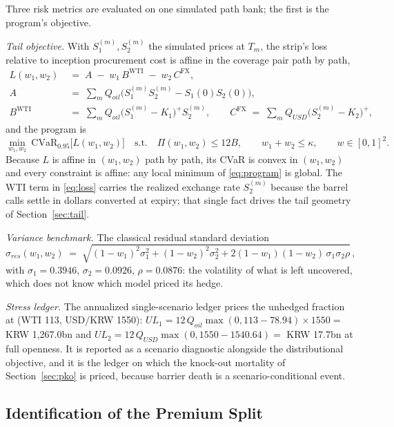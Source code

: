 \documentclass[11pt,a4paper]{article}
\begin{document}
Three risk metrics are evaluated on one simulated path bank; the first is the program's objective.

\emph{Tail objective.} With $S_1^{(m)},S_2^{(m)}$ the simulated prices at $T_m$, the strip's loss relative to inception procurement cost is affine in the coverage pair path by path,
\begin{align}
L(w_1,w_2) \;&=\; A \;-\; w_1\,B^{\mathrm{WTI}} \;-\; w_2\,C^{\mathrm{FX}},
\label{eq:loss}\\
A \;&=\; \sum_m Q_{oil}\bigl(S_1^{(m)}S_2^{(m)}-S_1(0)S_2(0)\bigr), \nonumber\\
B^{\mathrm{WTI}} \;&=\; \sum_m Q_{oil}\bigl(S_1^{(m)}-K_1\bigr)^{+}S_2^{(m)}, \qquad
C^{\mathrm{FX}} \;=\; \sum_m Q_{USD}\bigl(S_2^{(m)}-K_2\bigr)^{+}, \nonumber
\end{align}
and the program is
\begin{equation}
\min_{w_1,w_2}\ \mathrm{CVaR}_{0.95}\bigl[L(w_1,w_2)\bigr]
\quad\text{s.t.}\quad \Pi(w_1,w_2)\le 12B,\qquad w_1+w_2\le\kappa,\qquad w\in[0,1]^2.
\label{eq:program}
\end{equation}
Because $L$ is affine in $(w_1,w_2)$ path by path, its CVaR is convex in $(w_1,w_2)$ and every constraint is affine: any local minimum of \eqref{eq:program} is global. The WTI term in \eqref{eq:loss} carries the realized exchange rate $S_2^{(m)}$ because the barrel calls settle in dollars converted at expiry; that single fact drives the tail geometry of Section~\ref{sec:tail}.

\emph{Variance benchmark.} The classical residual standard deviation
\begin{equation}
\sigma_{res}(w_1,w_2) \;=\; \sqrt{(1-w_1)^2\sigma_1^2 + (1-w_2)^2\sigma_2^2 + 2(1-w_1)(1-w_2)\,\sigma_1\sigma_2\rho}\,,
\label{eq:gmvp}
\end{equation}
with $\sigma_1=0.3946$, $\sigma_2=0.0926$, $\rho=0.0876$: the volatility of what is left uncovered, which does not know which model priced its hedge.

\emph{Stress ledger.} The annualized single-scenario ledger prices the unhedged fraction at (WTI 113, USD/KRW 1550): $UL_1=12\,Q_{oil}\max(0,113-78.94)\times1550=$ KRW 1{,}267.0bn and $UL_2=12\,Q_{USD}\max(0,1550-1540.64)=$ KRW 17.7bn at full openness. It is reported as a scenario diagnostic alongside the distributional objective, and it is the ledger on which the knock-out mortality of Section~\ref{sec:pko} is priced, because barrier death is a scenario-conditional event.

\subsection{Identification of the Premium Split}
\label{sec:split}
\end{document}
